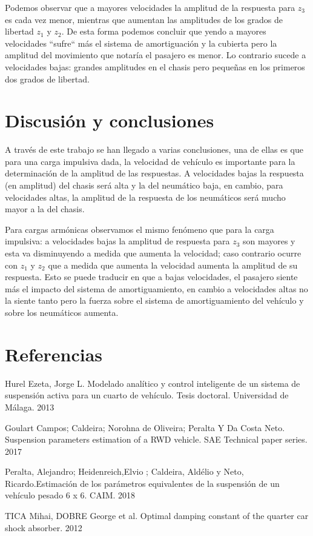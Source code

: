 \documentclass[oneside, a4paper, spanish, links]{amca}
\begin{document}
\Floatbarrier

Podemos observar que a mayores velocidades la amplitud de la respuesta para \textit{$z_3$} es cada vez menor, mientras que aumentan las amplitudes de los grados de libertad \textit{$z_1$} y \textit{$z_2$}. De esta forma podemos concluir que yendo a mayores velocidades ``sufre`` más el sistema de amortiguación y la cubierta pero la amplitud del movimiento que notaría el pasajero es menor. Lo contrario sucede a velocidades bajas: grandes amplitudes en el chasis pero pequeñas en los primeros dos grados de libertad.

\newpage
\section{Discusión y conclusiones}
A través de este trabajo se han llegado a varias conclusiones, una de ellas es que para una carga impulsiva dada, la velocidad de vehículo es importante para la determinación de la amplitud de las respuestas. A velocidades bajas la respuesta (en amplitud) del chasis será alta y la del neumático baja, en cambio, para velocidades altas, la amplitud de la respuesta de los neumáticos será mucho mayor a la del chasis.

Para cargas armónicas observamos el mismo fenómeno que para la carga impulsiva: a velocidades bajas la amplitud de respuesta para \textit{$z_3$} son mayores y esta va disminuyendo a medida que aumenta la velocidad; caso contrario ocurre con \textit{$z_1$} y \textit{$z_2$} que a medida que aumenta la velocidad aumenta la amplitud de su respuesta. Esto se puede traducir en que a bajas velocidades, el pasajero siente más el impacto del sistema de amortiguamiento, en cambio a velocidades altas no la siente tanto pero la fuerza sobre el sistema de amortiguamiento del vehículo y sobre los neumáticos aumenta.

% 
\section{Referencias}



Hurel Ezeta, Jorge L. Modelado analítico y control inteligente de un sistema de suspensión activa para un cuarto de vehículo. Tesis doctoral. Universidad de Málaga. 2013


Goulart Campos; Caldeira; Norohna de Oliveira; Peralta Y Da Costa Neto. Suspension parameters estimation of a RWD vehicle. SAE Technical paper series. 2017



Peralta, Alejandro; Heidenreich,Elvio ; Caldeira,  Aldélio y Neto, Ricardo.Estimación de los parámetros equivalentes de la suspensión de un vehículo pesado 6 x 6. CAIM. 2018

TICA Mihai, DOBRE George et al. Optimal damping constant of the quarter car shock absorber. 2012 \label{libro_tabla}



\newpage
\tableofcontents
\end{document}
